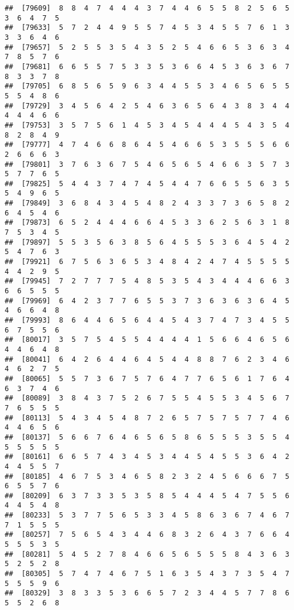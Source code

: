 \documentclass[
]{book}
\begin{document}
\begin{verbatim}
##  [79609]  8  8  4  7  4  4  4  3  7  4  4  6  5  5  8  2  5  6  5  3  6  4  7  5
##  [79633]  5  7  2  4  4  9  5  5  7  4  5  3  4  5  5  7  6  1  3  3  3  6  4  6
##  [79657]  5  2  5  5  3  5  4  3  5  2  5  4  6  6  5  3  6  3  4  7  8  5  7  6
##  [79681]  6  6  5  5  7  5  3  3  5  3  6  6  4  5  3  6  3  6  7  8  3  3  7  8
##  [79705]  6  8  5  6  5  9  6  3  4  4  5  5  3  4  6  5  6  5  5  5  5  4  8  6
##  [79729]  3  4  5  6  4  2  5  4  6  3  6  5  6  4  3  8  3  4  4  4  4  4  6  6
##  [79753]  3  5  7  5  6  1  4  5  3  4  5  4  4  4  5  4  3  5  4  8  2  8  4  9
##  [79777]  4  7  4  6  6  8  6  4  5  4  6  6  5  3  5  5  5  6  6  2  6  6  6  3
##  [79801]  3  7  6  3  6  7  5  4  6  5  6  5  4  6  6  3  5  7  3  5  7  7  6  5
##  [79825]  5  4  4  3  7  4  7  4  5  4  4  7  6  6  5  5  6  3  5  5  4  9  6  5
##  [79849]  3  6  8  4  3  4  5  4  8  2  4  3  3  7  3  6  5  8  2  6  4  5  4  6
##  [79873]  6  5  2  4  4  4  6  6  4  5  3  3  6  2  5  6  3  1  8  7  5  3  4  5
##  [79897]  5  5  3  5  6  3  8  5  6  4  5  5  5  3  6  4  5  4  2  5  4  7  6  3
##  [79921]  6  7  5  6  3  6  5  3  4  8  4  2  4  7  4  5  5  5  5  4  4  2  9  5
##  [79945]  7  2  7  7  7  5  4  8  5  3  5  4  3  4  4  4  6  6  3  6  6  5  5  5
##  [79969]  6  4  2  3  7  7  6  5  5  3  7  3  6  3  6  3  6  4  5  4  6  6  4  8
##  [79993]  8  6  4  4  6  5  6  4  4  5  4  3  7  4  7  3  4  5  5  6  7  5  5  6
##  [80017]  3  5  7  5  4  5  5  4  4  4  4  1  5  6  6  4  6  5  6  4  4  6  4  8
##  [80041]  6  4  2  6  4  4  6  4  5  4  4  8  8  7  6  2  3  4  6  4  6  2  7  5
##  [80065]  5  5  7  3  6  7  5  7  6  4  7  7  6  5  6  1  7  6  4  6  3  7  4  6
##  [80089]  3  8  4  3  7  5  2  6  7  5  5  4  5  5  3  4  5  6  7  7  6  5  5  5
##  [80113]  5  4  3  4  5  4  8  7  2  6  5  7  5  7  5  7  7  4  6  4  4  6  5  6
##  [80137]  5  6  6  7  6  4  6  5  6  5  8  6  5  5  5  3  5  5  4  5  5  5  5  5
##  [80161]  6  6  5  7  4  3  4  5  3  4  4  5  4  5  5  3  6  4  2  4  4  5  5  7
##  [80185]  4  6  7  5  3  4  6  5  8  2  3  2  4  5  6  6  6  7  5  6  5  5  7  6
##  [80209]  6  3  7  3  3  5  3  5  8  5  4  4  4  5  4  7  5  5  6  4  4  5  4  8
##  [80233]  5  3  7  7  5  6  5  3  3  4  5  8  6  3  6  7  4  6  7  7  1  5  5  5
##  [80257]  7  5  6  5  4  3  4  4  6  8  3  2  6  4  3  7  6  6  4  5  5  5  3  5
##  [80281]  5  4  5  2  7  8  4  6  6  5  6  5  5  5  8  4  3  6  3  5  2  5  2  8
##  [80305]  5  7  4  7  4  6  7  5  1  6  3  5  4  3  7  3  5  4  7  5  5  5  9  6
##  [80329]  3  8  3  3  5  3  6  6  5  7  2  3  4  4  5  7  7  8  6  5  5  2  6  8

\end{verbatim}
\end{document}

